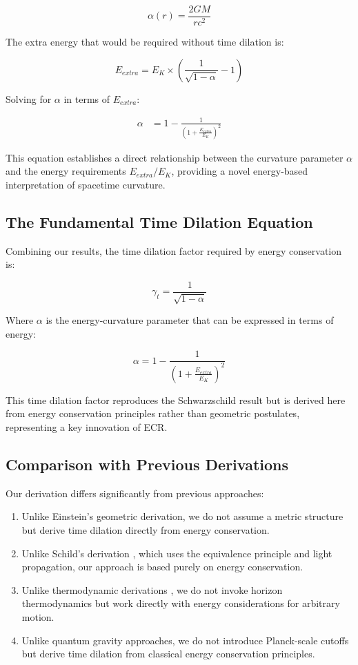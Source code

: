 \documentclass[11pt,a4paper]{article}
\newcommand{\keyequation}[2]{
    \begin{equation}
        \boxed{#1} \tag{#2}
    \end{equation}
}
\begin{document}
\begin{equation}
    \alpha(r) = \frac{2GM}{rc^2}
\end{equation}

The extra energy that would be required without time dilation is:

\begin{equation}
    E_{extra} = E_K \times \left(\frac{1}{\sqrt{1-\alpha}} - 1\right)
\end{equation}

Solving for $\alpha$ in terms of $E_{extra}$:

\begin{align}
    \alpha &= 1 - \frac{1}{\left(1 + \frac{E_{extra}}{E_K}\right)^2}
\end{align}

This equation establishes a direct relationship between the curvature parameter $\alpha$ and the energy requirements $E_{extra}/E_K$, providing a novel energy-based interpretation of spacetime curvature.

\subsection{The Fundamental Time Dilation Equation}
Combining our results, the time dilation factor required by energy conservation is:

\keyequation{\gamma_t = \frac{1}{\sqrt{1-\alpha}}}{2}

Where $\alpha$ is the energy-curvature parameter that can be expressed in terms of energy:

\keyequation{\alpha = 1 - \frac{1}{\left(1 + \frac{E_{extra}}{E_K}\right)^2}}{3}

This time dilation factor reproduces the Schwarzschild result but is derived here from energy conservation principles rather than geometric postulates, representing a key innovation of ECR.

\subsection{Comparison with Previous Derivations}
Our derivation differs significantly from previous approaches:

\begin{enumerate}
    \item Unlike Einstein's geometric derivation, we do not assume a metric structure but derive time dilation directly from energy conservation.
    
    \item Unlike Schild's derivation \cite{schild1960}, which uses the equivalence principle and light propagation, our approach is based purely on energy conservation.
    
    \item Unlike thermodynamic derivations \cite{jacobson1995}, we do not invoke horizon thermodynamics but work directly with energy considerations for arbitrary motion.
    
    \item Unlike quantum gravity approaches, we do not introduce Planck-scale cutoffs but derive time dilation from classical energy conservation principles.
\end{enumerate}
\end{document}
